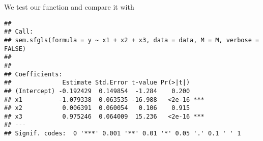 \begin{knitrout}
\begin{kframe}
\begin{alltt}
  \hlstd{(}\hlstd{)}
  \hlopt{$}    \hlstd{=} \hlstd{,}  \hlstd{=} \hlstd{)}
  \hlstd{(}\hlstd{)}
\hlstd{\}}
\end{alltt}
\end{kframe}
\end{knitrout}

We test our function and compare it with 
\begin{knitrout}
\color{fgcolor}\begin{kframe}
\begin{alltt}
 \hlkwb{<-}  \hlopt{~}  \hlopt{+}  \hlopt{+}       \hlstd{=} \hlstd{)}
\end{alltt}
\begin{verbatim}
## 
## Call:
## sem.sfgls(formula = y ~ x1 + x2 + x3, data = data, M = M, verbose = FALSE)
## 
## 
## Coefficients:
##              Estimate Std.Error t-value Pr(>|t|)    
## (Intercept) -0.192429  0.149854  -1.284    0.200    
## x1          -1.079338  0.063535 -16.988   <2e-16 ***
## x2           0.006391  0.060054   0.106    0.915    
## x3           0.975246  0.064009  15.236   <2e-16 ***
## ---
## Signif. codes:  0 '***' 0.001 '**' 0.01 '*' 0.05 '.' 0.1 ' ' 1
\end{verbatim}
\end{kframe}
\end{knitrout}

